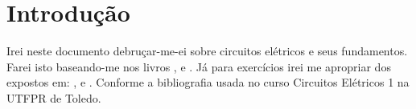 \section{Introdução}

Irei neste documento debruçar-me-ei sobre circuitos elétricos e seus
fundamentos. Farei isto baseando-me nos livros 
\cite{alexander2008},  \cite{hayt2008} e
 \cite{boylestad2012}. Já para exercícios irei me
apropriar dos expostos em:  \cite{svoboda2016},
 \cite{nilsson2016} e 
\cite{irwin2000}. Conforme a bibliografia usada no curso Circuitos Elétricos 1
na UTFPR de Toledo.
